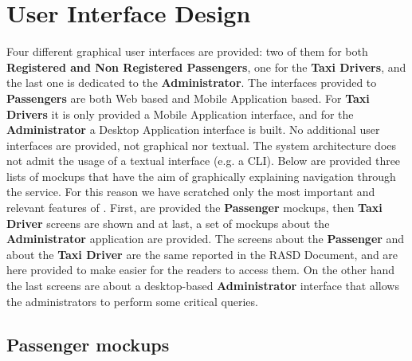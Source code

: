 \section{User Interface Design}
Four different graphical user interfaces are provided: two of them for both \textbf{Registered and Non Registered Passengers}, one for the \textbf{Taxi Drivers}, and the last one is dedicated to the \textbf{Administrator}.
The interfaces provided to \textbf{Passengers} are both Web based and Mobile Application based.
For \textbf{Taxi Drivers} it is only provided a Mobile Application interface, and for the \textbf{Administrator} a Desktop Application interface is built.
No additional user interfaces are provided, not graphical nor textual.
The system architecture does not admit the usage of a textual interface (e.g. a CLI).
Below are provided three lists of mockups that have the aim of graphically explaining navigation through the service.
For this reason we have scratched only the most important and relevant features of \myTaxiService{}.
First, are provided the \textbf{Passenger} mockups, then \textbf{Taxi Driver} screens are shown and at last, a set of mockups about the \textbf{Administrator} application are provided.
The screens about the \textbf{Passenger} and about the \textbf{Taxi Driver} are the same reported in the RASD Document, and are here provided to make easier for the readers to access them.
On the other hand the last screens are about a desktop-based \textbf{Administrator} interface that allows the administrators to  perform some critical queries.

\subsection{Passenger mockups}
\begin{itemize}
\end{itemize}
\newpage
